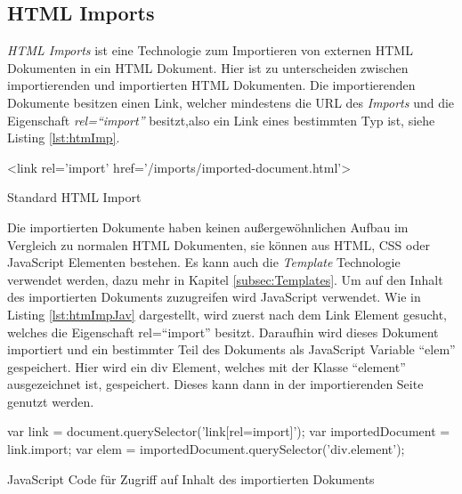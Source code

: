 \documentclass[12pt, paper=a4, bibtotoc, toc=listof, headsepline=true]{scrreprt}
\begin{document}
		\subsection{HTML Imports}
		\emph{\ac{HTML} Imports} ist eine Technologie zum Importieren von externen \ac{HTML} Dokumenten in ein \ac{HTML} Dokument. Hier ist zu unterscheiden zwischen importierenden und importierten \ac{HTML} Dokumenten. Die importierenden Dokumente besitzen einen Link, welcher mindestens die \ac{URL} des \emph{Imports} und die Eigenschaft \emph{rel=\enquote{import}} besitzt,also ein Link eines bestimmten Typ ist, siehe Listing \ref{lst:htmImp}.\cite[vgl.]{Glazkov2016} 
		\begin{listing}
			\begin{HTMLcode*}{}
 <link rel='import' href='/imports/imported-document.html'>
				\end{HTMLcode*}
			\caption{Standard HTML Import}
			\label{lst:htmImp}
		\end{listing}
		Die importierten Dokumente haben keinen außergewöhnlichen Aufbau im Vergleich zu normalen \ac{HTML} Dokumenten, sie können aus \ac{HTML}, \ac{CSS} oder JavaScript Elementen bestehen. Es kann auch die \emph{Template} Technologie verwendet werden, dazu mehr in Kapitel \ref{subsec:Templates}.
		Um auf den Inhalt des importierten Dokuments zuzugreifen wird JavaScript verwendet. Wie in Listing \ref{lst:htmImpJav} dargestellt, wird zuerst nach dem Link Element gesucht, welches die Eigenschaft rel=\enquote{import} besitzt. Daraufhin wird dieses Dokument importiert und ein bestimmter Teil des Dokuments als JavaScript Variable \enquote{elem} gespeichert. Hier wird ein div Element, welches mit der Klasse \enquote{element} ausgezeichnet ist, gespeichert. Dieses kann dann in der importierenden Seite genutzt werden. 
		\begin{listing}
			\begin{JavaScriptcode*}{}
var link = document.querySelector('link[rel=import]');
var importedDocument = link.import;
var elem = importedDocument.querySelector('div.element');
			\end{JavaScriptcode*}
			\caption{JavaScript Code für Zugriff auf Inhalt des importierten Dokuments}
			\label{lst:htmImpJav}
		\end{listing} 
\end{document}
